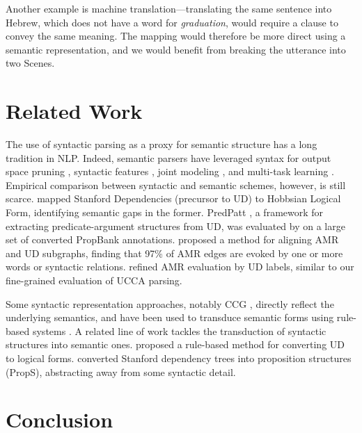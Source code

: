 \documentclass[11pt,a4paper,table]{article}
\begin{document}
Another example is machine translation---translating the same sentence into Hebrew,
which does not have a word for \textit{graduation},
would require a clause to convey the same meaning.
The mapping would therefore be more direct using a semantic representation,
and we would benefit from breaking the utterance into two Scenes.


\section{Related Work}\label{sec:related_work}

The use of syntactic parsing as a proxy for semantic structure has a long tradition in NLP.
Indeed, semantic parsers have leveraged syntax
for output space pruning \cite{xue2004calibrating}, 
syntactic features \cite{gildea2002automatic,hershcovich2017a}, 
joint modeling \cite{surdeanu2008conll,hajivc2009conll}, and
multi-task learning \cite{swayamdipta2016greedy,swayamdipta2018syntactic,hershcovich2018multitask}.
Empirical comparison between syntactic and semantic schemes, however,
is still scarce.
 mapped Stanford Dependencies
(precursor to UD) to Hobbsian Logical Form, identifying semantic gaps in the former.
PredPatt \citep{white2016universal},
a framework for extracting predicate-argument structures from UD,
was evaluated by 
on a large set of converted PropBank annotations.
 proposed a method for aligning AMR and UD subgraphs,
finding that 97\% of AMR edges are evoked by one or more
words or syntactic relations.
 refined AMR evaluation by UD labels,
similar to our fine-grained evaluation of UCCA parsing.

Some syntactic representation approaches, notably CCG \cite{Steedman:00},
directly reflect the underlying semantics, and have been used to
transduce semantic forms using rule-based systems \cite{Basile:12}.
A related line of work tackles the transduction of syntactic structures into semantic ones.
 proposed a rule-based method for converting UD
to logical forms.
 converted Stanford dependency trees into
proposition structures ({\sc PropS}), abstracting away from some syntactic detail.

\section{Conclusion}\label{sec:conclusion}
\end{document}
